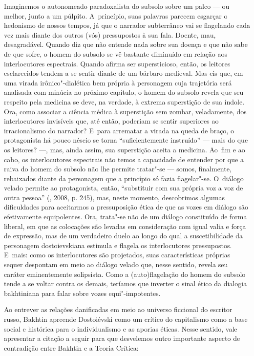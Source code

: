 Imaginemos o autonomeado paradoxalista do subsolo sobre um palco --- ou
melhor, junto a um púlpito. A~princípio, suas palavras parecem esgarçar
o hedonismo de nossos tempos, já que o narrador subterrâneo vai se
flagelando cada vez mais diante dos outros (vós) pressupostos à sua
fala. Doente, mau, desagradável. Quando diz que não entende nada sobre
sua doença e que não sabe de que sofre, o homem do subsolo se vê
bastante diminuído em relação aos interlocutores espectrais. Quando
afirma ser supersticioso, então, os leitores esclarecidos tendem a se
sentir diante de um bárbaro medieval. Mas eis que, em uma virada
irônico"-dialética bem própria à personagem cuja trajetória será
analisada com minúcia no próximo capítulo, o homem do subsolo revela que
seu respeito pela medicina se deve, na verdade, à extrema superstição de
sua índole. Ora, como associar a ciência médica à superstição sem
zombar, veladamente, dos interlocutores invisíveis que, até então,
poderiam se sentir superiores ao irracionalismo do narrador? E~para
arrematar a virada na queda de braço, o protagonista há pouco néscio se
torna ``suficientemente instruído'' --- mais do que os leitores? ---, mas,
ainda assim, sua superstição aceita a medicina. Ao~fim e ao cabo, os
interlocutores espectrais não temos a capacidade de entender por que a
raiva do homem do subsolo não lhe permite tratar"-se --- somos,
finalmente, rebaixados diante da personagem que a princípio só fazia
flagelar"-se. O~diálogo velado permite ao protagonista, então,
``substituir com sua própria voz a voz de outra pessoa'' (, 2008, p. 245), mas, neste momento, descobrimos algumas dificuldades para
aceitarmos a pressuposição ética de que as vozes em diálogo são
efetivamente equipolentes. Ora, trata"-se não de um diálogo constituído
de forma liberal, em que as colocações são levadas em consideração com
igual valia e força de expressão, mas de um verdadeiro duelo ao longo do
qual a suscetibilidade da personagem dostoievskiana estimula e flagela
os interlocutores pressupostos. E~mais: como os interlocutores são
projetados, suas características próprias sequer despontam em meio ao
diálogo velado que, nesse sentido, revela seu caráter eminentemente
solipsista. Como a (auto)flagelação do homem do subsolo tende a se
voltar contra os demais, teríamos que inverter o sinal ético da dialogia
bakhtiniana para falar sobre vozes equi"-impotentes.

Ao entrever as relações danificadas em meio ao universo ficcional do
escritor russo, Bakhtin apreende Dostoiévski como um crítico do
capitalismo como a base social e histórica para o individualismo e as
aporias éticas. Nesse sentido, vale apresentar a citação a seguir para
que desvelemos outro importante aspecto de contradição entre Bakhtin e a
Teoria Crítica:

